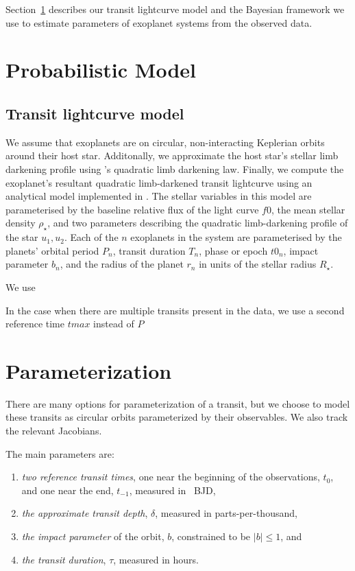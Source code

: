 \documentclass[modern]{aastex63}
\begin{document}
Section~\ref{sec:prob-model} describes our transit lightcurve model and the Bayesian framework we use to estimate parameters of exoplanet systems from the observed data.

\section{Probabilistic Model} \label{sec:prob-model}

\subsection{Transit lightcurve model}
We assume that exoplanets are on circular, non-interacting Keplerian orbits around their host star.
Additonally, we approximate the host star's stellar limb darkening profile using \citet{Kipping:2013}'s quadratic limb darkening law.
Finally, we compute the exoplanet's resultant quadratic limb-darkened transit lightcurve using an analytical model implemented in \starry.
The stellar variables in this model are parameterised by
the baseline relative flux of the light curve $f0$,
the mean stellar density $\rho_\star$,
and two parameters describing the quadratic limb-darkening profile of the
star $u_1, u_2$.
Each of the $n$ exoplanets in the system are parameterised by the planets'
orbital period $P_{n}$,
transit duration $T_{n}$,
phase or epoch $t0_n$,
impact parameter $b_n$,
and the radius of the planet $r_n$ in units of the stellar radius $R_\star$.

We use \exoplanet\, \lightkurve


In the case when there are multiple transits present in the data, we use a second reference time $tmax$ instead of $P$


\section{Parameterization}

There are many options for parameterization of a transit, but we choose to model these transits as circular orbits parameterized by their observables.
We also track the relevant Jacobians.

The main parameters are:
\begin{enumerate}
  \item \emph{two reference transit times}, one near the beginning of the observations, $t_0$, and one near the end, $t_{-1}$, measured in \tess\ BJD,
  \item \emph{the approximate transit depth}, $\delta$, measured in parts-per-thousand,
  \item \emph{the impact parameter} of the orbit, $b$, constrained to be $|b| \le 1$, and
  \item \emph{the transit duration}, $\tau$, measured in hours.
\end{enumerate}
\end{document}
